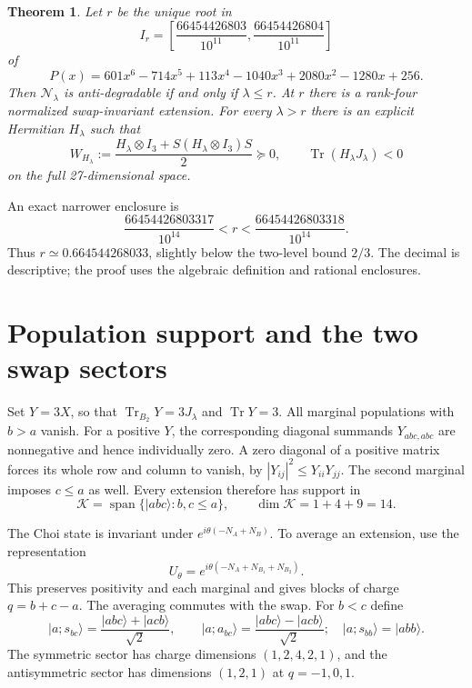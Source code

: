\documentclass[11pt]{article}
\newcommand{\ket}[1]{\lvert #1\rangle}
\newcommand{\Tr}{\operatorname{Tr}}
\newcommand{\N}{\mathcal N}
\newcommand{\K}{\mathcal K}
\newtheorem{theorem}{Theorem}
\begin{document}
\begin{theorem}\label{thm:threshold}
Let $r$ be the unique root in
\begin{equation}\label{eq:root-interval}
I_r=\left[\frac{66454426803}{10^{11}},
                \frac{66454426804}{10^{11}}\right]
\end{equation}
of
\begin{equation}\label{eq:polynomial}
P(x)=601x^6-714x^5+113x^4-1040x^3+2080x^2-1280x+256.
\end{equation}
Then $\N_\lambda$ is anti-degradable if and only if $\lambda\leq r$.
At $r$ there is a rank-four normalized swap-invariant extension.
For every $\lambda>r$ there is an explicit Hermitian $H_\lambda$ such that
\begin{equation}\label{eq:dual-condition}
W_{H_\lambda}:=\frac{H_\lambda\otimes I_3+
S(H_\lambda\otimes I_3)S}{2}\succeq0,\qquad
\Tr(H_\lambda J_\lambda)<0
\end{equation}
on the full 27-dimensional space.
\end{theorem}

An exact narrower enclosure is
\begin{equation}\label{eq:refined}
\frac{66454426803317}{10^{14}}<r<
\frac{66454426803318}{10^{14}}.
\end{equation}
Thus $r\simeq0.664544268033$, slightly below the two-level bound $2/3$.
The decimal is descriptive; the proof uses the algebraic definition and
rational enclosures.

\section{Population support and the two swap sectors}\label{sec:reduction}
Set $Y=3X$, so that $\Tr_{B_2}Y=3J_\lambda$ and $\Tr Y=3$.
All marginal populations with $b>a$ vanish. For a positive $Y$, the
corresponding diagonal summands $Y_{abc,abc}$ are nonnegative and hence
individually zero. A zero diagonal of a positive matrix forces its whole
row and column to vanish, by $|Y_{ij}|^2\leq Y_{ii}Y_{jj}$.
The second marginal imposes $c\leq a$ as well. Every extension therefore
has support in
\begin{equation}\label{eq:support}
\K=\operatorname{span}\{\ket{abc}:b,c\leq a\},\qquad
\dim\K=1+4+9=14.
\end{equation}

The Choi state is invariant under $e^{i\theta(-N_A+N_B)}$.
To average an extension, use the representation
\begin{equation}
U_\theta=e^{i\theta(-N_A+N_{B_1}+N_{B_2})}.
\end{equation}
This preserves positivity and each marginal and gives blocks of charge
$q=b+c-a$. The averaging commutes with the swap. For $b<c$ define
\begin{equation}
\ket{a;s_{bc}}=\frac{\ket{abc}+\ket{acb}}{\sqrt2},\qquad
\ket{a;a_{bc}}=\frac{\ket{abc}-\ket{acb}}{\sqrt2};
\quad\ket{a;s_{bb}}=\ket{abb}.
\end{equation}
The symmetric sector has charge dimensions $(1,2,4,2,1)$, and the
antisymmetric sector has dimensions $(1,2,1)$ at $q=-1,0,1$.
\end{document}
